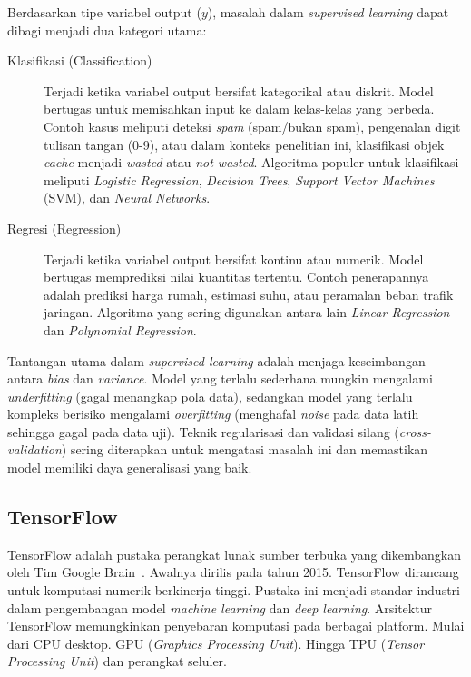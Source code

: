 Berdasarkan tipe variabel output ($y$), masalah dalam
\textit{supervised learning}
dapat dibagi menjadi dua kategori utama:

\begin{description}
  \item[Klasifikasi (Classification)]
    Terjadi ketika variabel output bersifat kategorikal atau diskrit.
    Model bertugas untuk memisahkan input ke dalam kelas-kelas yang berbeda.
    Contoh kasus meliputi deteksi \textit{spam} (spam/bukan spam),
    pengenalan digit tulisan tangan (0-9), atau dalam konteks penelitian ini,
    klasifikasi objek \textit{cache} menjadi \textit{wasted} atau
    \textit{not wasted}.
    Algoritma populer untuk klasifikasi meliputi \textit{Logistic Regression},
    \textit{Decision Trees}, \textit{Support Vector Machines} (SVM),
    dan \textit{Neural Networks}.

  \item[Regresi (Regression)]
    Terjadi ketika variabel output bersifat kontinu atau numerik.
    Model bertugas memprediksi nilai kuantitas tertentu.
    Contoh penerapannya adalah prediksi harga rumah, estimasi suhu,
    atau peramalan beban trafik jaringan.
    Algoritma yang sering digunakan antara lain \textit{Linear Regression}
    dan \textit{Polynomial Regression}.
\end{description}

Tantangan utama dalam \textit{supervised learning} adalah menjaga keseimbangan
antara \textit{bias} dan \textit{variance}.
Model yang terlalu sederhana mungkin mengalami \textit{underfitting}
(gagal menangkap
pola data), sedangkan model yang terlalu kompleks berisiko mengalami
\textit{overfitting}
(menghafal \textit{noise} pada data latih sehingga gagal pada data uji).
Teknik regularisasi dan validasi silang (\textit{cross-validation})
sering diterapkan untuk mengatasi masalah ini dan memastikan model memiliki
daya generalisasi yang baik.

\subsection{TensorFlow}
TensorFlow adalah pustaka perangkat lunak sumber terbuka yang dikembangkan
oleh Tim Google Brain~\cite{tensorflow2015-whitepaper}.
Awalnya dirilis pada tahun 2015.
TensorFlow dirancang untuk komputasi numerik berkinerja tinggi.
Pustaka ini menjadi standar industri dalam pengembangan model
\textit{machine learning} dan \textit{deep learning}.
Arsitektur TensorFlow memungkinkan penyebaran komputasi pada berbagai
platform.
Mulai dari CPU desktop.
GPU (\textit{Graphics Processing Unit}).
Hingga TPU (\textit{Tensor Processing Unit}) dan perangkat seluler.

